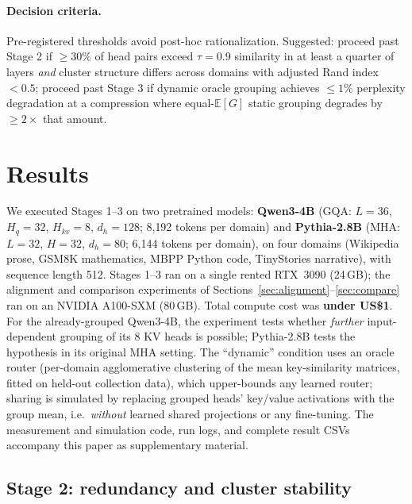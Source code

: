 \documentclass{article}
\newcommand{\E}{\mathbb{E}}
\begin{document}
\paragraph{Decision criteria.}
Pre-registered thresholds avoid post-hoc rationalization. Suggested:
proceed past Stage 2 if $\ge 30\%$ of head pairs exceed $\tau = 0.9$
similarity in at least a quarter of layers \emph{and} cluster structure
differs across domains with adjusted Rand index $< 0.5$; proceed past
Stage 3 if dynamic oracle grouping achieves $\le 1\%$ perplexity degradation
at a compression where equal-$\E[G]$ static grouping degrades by
$\ge 2\times$ that amount.

\section{Results}
\label{sec:results}

We executed Stages 1--3 on two pretrained models: \textbf{Qwen3-4B}
(GQA: $L{=}36$, $H_q{=}32$, $H_{kv}{=}8$, $d_h{=}128$; 8{,}192 tokens per
domain) and \textbf{Pythia-2.8B} (MHA: $L{=}32$, $H{=}32$, $d_h{=}80$;
6{,}144 tokens per domain), on four domains (Wikipedia prose, GSM8K
mathematics, MBPP Python code, TinyStories narrative), with sequence length
512. Stages 1--3 ran on a single rented RTX~3090 (24\,GB); the alignment and comparison experiments of Sections~\ref{sec:alignment}--\ref{sec:compare} ran on an NVIDIA A100-SXM (80\,GB). Total compute cost was
\textbf{under US\$1}. For the already-grouped Qwen3-4B, the experiment tests
whether \emph{further} input-dependent grouping of its 8 KV heads is
possible; Pythia-2.8B tests the hypothesis in its original MHA setting. The
``dynamic'' condition uses an oracle router (per-domain agglomerative
clustering of the mean key-similarity matrices, fitted on held-out
collection data), which upper-bounds any learned router; sharing is
simulated by replacing grouped heads' key/value activations with the group
mean, i.e.\ \emph{without} learned shared projections or any fine-tuning.
The measurement and simulation code, run logs, and complete result CSVs
accompany this paper as supplementary material.

\subsection{Stage 2: redundancy and cluster stability}
\label{sec:stage2results}
\end{document}

